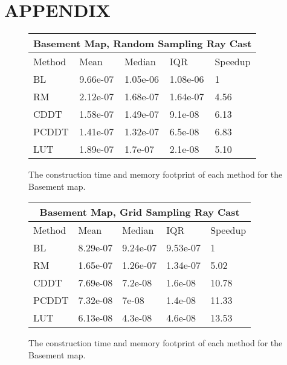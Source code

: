 \documentclass[letterpaper, 10 pt, conference]{ieeeconf}  %
\begin{document}



\section*{APPENDIX}

\begin{figure}[h]
\begin{center}
\begin{tabular}{ | m{1.05cm} | m{1.3cm}| m{1.6cm} | m{1.25cm} | m{1.25cm}|  } 
\hline
\multicolumn{5}{|c|}{Basement Map, Random Sampling Ray Cast} \\
\hline
Method & Mean & Median & IQR & Speedup \\
\hline
BL & 9.66e-07 & 1.05e-06 & 1.08e-06 & 1 \\
RM & 2.12e-07 & 1.68e-07 & 1.64e-07 & 4.56 \\
CDDT & 1.58e-07 & 1.49e-07 & 9.1e-08 & 6.13 \\
PCDDT & 1.41e-07 & 1.32e-07 & 6.5e-08 & 6.83 \\
LUT & 1.89e-07 & 1.7e-07 & 2.1e-08 & 5.10 \\
\hline
\end{tabular}
\end{center}
\caption{The construction time and memory footprint of each method for the Basement map.}
\label{table:basement:init}
\end{figure}

\begin{figure}[h]
\begin{center}
\begin{tabular}{ | m{1.05cm} | m{1.3cm}| m{1.6cm} | m{1.25cm} | m{1.25cm}|  } 
\hline
\multicolumn{5}{|c|}{Basement Map, Grid Sampling Ray Cast} \\
\hline
Method & Mean & Median & IQR & Speedup \\
\hline
BL & 8.29e-07 & 9.24e-07 & 9.53e-07 & 1 \\
RM & 1.65e-07 & 1.26e-07 & 1.34e-07 & 5.02 \\
CDDT & 7.69e-08 & 7.2e-08 & 1.6e-08 & 10.78 \\
PCDDT & 7.32e-08 & 7e-08 & 1.4e-08 & 11.33 \\
LUT & 6.13e-08 & 4.3e-08 & 4.6e-08 & 13.53 \\
\hline
\end{tabular}
\end{center}
\caption{The construction time and memory footprint of each method for the Basement map.}
\label{table:basement:init}
\end{figure}
\end{document}
